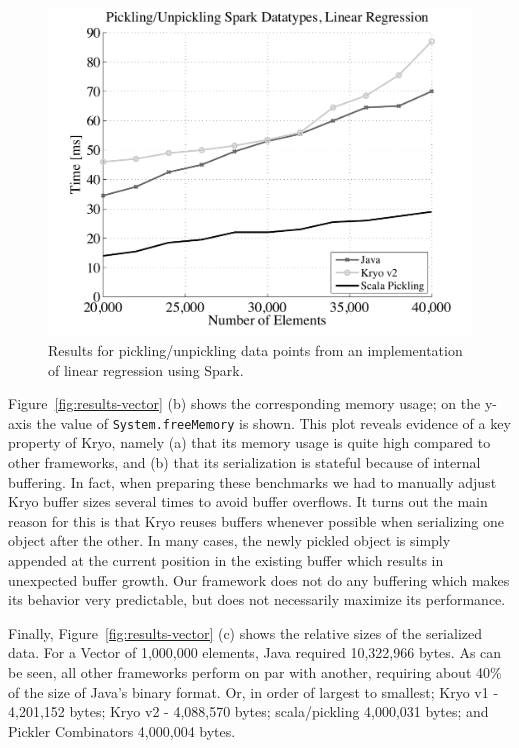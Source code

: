 \documentclass[10pt]{sigplanconf}
\theoremstyle{definition}
\theoremstyle{definition}
\begin{document}
\begin{figure}[ht!]
 \centering
 \includegraphics[width=\columnwidth]{sparklr.pdf}
 \caption{Results for pickling/unpickling data points from an implementation of linear regression using Spark.}
 \label{fig:spark}
\end{figure}

Figure~\ref{fig:results-vector} (b) shows the corresponding memory usage; on the
y-axis the value of \texttt{System.freeMemory} is shown. This plot
reveals evidence of a key property of Kryo, namely (a) that its memory usage
is quite high compared to other frameworks, and (b) that its
serialization is stateful because of internal buffering. In fact, when
preparing these benchmarks we had to manually adjust Kryo buffer sizes
several times to avoid buffer overflows. It turns out the main reason
for this is that Kryo reuses buffers whenever possible when
serializing one object after the other. In many cases, the
newly pickled object is simply appended at the current position in the
existing buffer which results in unexpected buffer growth. Our
framework does not do any buffering which makes its behavior very
predictable, but does not necessarily maximize its performance.

Finally, Figure~\ref{fig:results-vector} (c) shows the relative sizes of the serialized data. For a Vector of 1,000,000 elements, Java required 10,322,966 bytes. As can be seen, all other frameworks perform on par with another, requiring about 40\% of the size of Java's binary format. Or, in order of largest to smallest; Kryo v1 - 4,201,152 bytes; Kryo v2 - 4,088,570 bytes; scala/pickling 4,000,031 bytes; and Pickler Combinators 4,000,004 bytes.
\end{document}
